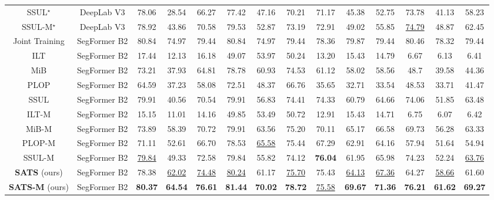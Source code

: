 \documentclass[onecolumn,conference,compsoc]{IEEEtran}
\begin{document}
\begin{spacing}{1.5}
\begin{table*}[t]
{\begin{tabular}{ c|c|ccc|ccc|ccc|ccc }
SSUL$^{\star}$ \cite{SSUL} & DeepLab V3 & 78.06 & 28.54 & 66.27 & 77.42 & 47.16 & 70.21 & 71.17 & 45.38 & 52.75 & 73.78 & 41.13 & 58.23\\
SSUL-M$^{\star}$ \cite{SSUL} & DeepLab V3 & 78.92 & 43.86 & 70.58 & 79.53 & 52.87 & 73.19 & 72.91 & 49.02 & 55.85 & \underline{74.79} & 48.87 & 62.45 \\
\midrule
Joint Training & SegFormer B2 & 80.84 & 74.97 & 79.44 & 80.84 & 74.97 & 79.44 & 78.36
& 79.87 & 79.44 & 80.46 & 78.32 & 79.44 \\
ILT \cite{ILT} & SegFormer B2 & 17.44 & 12.13 & 16.18 & 49.07 & 53.97 & 50.24 & 13.20 & 15.43 & 14.79 & 6.67 & 6.13 & 6.41 \\
MiB \cite{MiB} & SegFormer B2 & 73.21 & 37.93 & 64.81 & 78.78 & 60.93 & 74.53 & 61.12 & 58.02 & 58.56 & 48.7 & 39.58 & 44.36 \\
PLOP \cite{PLOP} & SegFormer B2 & 64.59 & 37.23 & 58.08 & 72.51 & 48.37 & 66.76 & 35.65 & 32.71 & 33.54 & 48.53 & 33.71 & 41.47 \\ 
SSUL \cite{SSUL} & SegFormer B2 & 79.91 & 40.56 & 70.54 & 79.91 & 56.83 & 74.41 & 74.33 & 60.79 & 64.66 & 74.06 & 51.85 & 63.48 \\
\midrule
ILT-M & SegFormer B2 & 15.15 & 11.01 & 14.16 & 49.85 & 53.49 & 50.72 & 12.91 & 15.43 & 14.71 & 6.75 & 6.07 & 6.42\\
MiB-M & SegFormer B2 & 73.89 & 58.39 & 70.72 & 79.91 & 63.56 & 75.20 & 70.11 & 65.17 & 66.58 & 69.73 & 56.28 & 63.33\\
PLOP-M & SegFormer B2 & 71.11 & 52.61 & 66.70 & 78.53 & \underline{65.58} & 75.44 & 67.29 & 62.91 & 64.16 & 57.94 & 51.64 & 54.94\\
SSUL-M & SegFormer B2 & \underline{79.84} & 49.33 & 72.58 & 79.84 & 55.82 & 74.12 & \textbf{76.04} & 61.95 & 65.98 & 74.23 & 52.24 & \underline{63.76} \\
\midrule
\textbf{SATS} (ours) & SegFormer B2 & 78.38 & \underline{62.02} & \underline{74.48} & \underline{80.24} & 61.17 & \underline{75.70} & 75.43 & \underline{64.13} & \underline{67.36} & 64.27 & \underline{58.66} & 61.60\\
\textbf{SATS-M} (ours) & SegFormer B2 & \textbf{80.37} & \textbf{64.54} & \textbf{76.61} & \textbf{81.44} & \textbf{70.02} & \textbf{78.72} & \underline{75.58} & \textbf{69.67} & \textbf{71.36} &  \textbf{76.21} & \textbf{61.62} & \textbf{69.27}\\
\bottomrule
\end{tabular}
} 

\label{tab:voc}
\end{table*}


\end{spacing}
\end{document}
